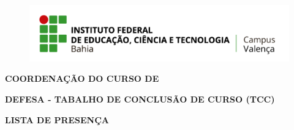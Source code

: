 \begin{center}
    \begin{figure}
        \centering
        \includegraphics[width=0.5\linewidth]{images/ifba_val_logo_hor.png}
    \end{figure}
    \begin{minipage}[!h]{0.80\textwidth}
        \centering
        \textbf{COORDENAÇÃO DO CURSO DE \MakeUppercase{\course}}
    \end{minipage}
\end{center}

\vspace*{1.2\baselineskip}
\begin{center}    
    \textbf{DEFESA - TABALHO DE CONCLUSÃO DE CURSO (TCC)}    
\end{center}
\vspace{1.25\baselineskip}

\begin{center}    
    \textbf{LISTA DE PRESENÇA}    
\end{center}
\vspace*{-0.2\baselineskip}

